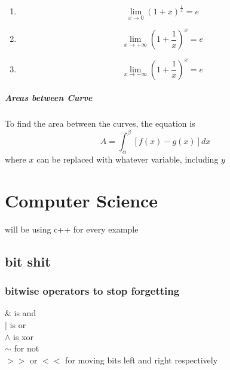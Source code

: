 \documentclass{article} %
\begin{document}
                    \begin{enumerate}[label=(\alph*)]
                        \item \begin{equation} \lim_{x\rightarrow0}(1+x)^{\frac{1}{x}}=e \end{equation}
                        \item \begin{equation} \lim_{x\rightarrow +\infty}(1+\frac{1}{x})^x=e \end{equation}
                        \item \begin{equation} \lim_{x\rightarrow -\infty}(1+\frac{1}{x})^x=e \end{equation}
                    \end{enumerate}
                \subparagraph{Areas between Curve}
                    To find the area between the curves, the equation is \begin{equation}
                        A=\int_{\alpha}^{\beta}[f(x)-g(x)]dx
                        \label{eq:AreaBtCurve}
                    \end{equation}
                    where $x$ can be replaced with whatever variable, including $y$
                    
\section{Computer Science}\label{Computer Science}
will be using c++ for every example
    \subsection{bit shit}
        \subsubsection{bitwise operators to stop forgetting}
            \begin{center}
                \& is and\\$|$ is or\\$\wedge$ is xor\\$\sim$ for not\\$>>$ or $<<$ for moving bits left and right respectively
            \end{center}
\end{document}
